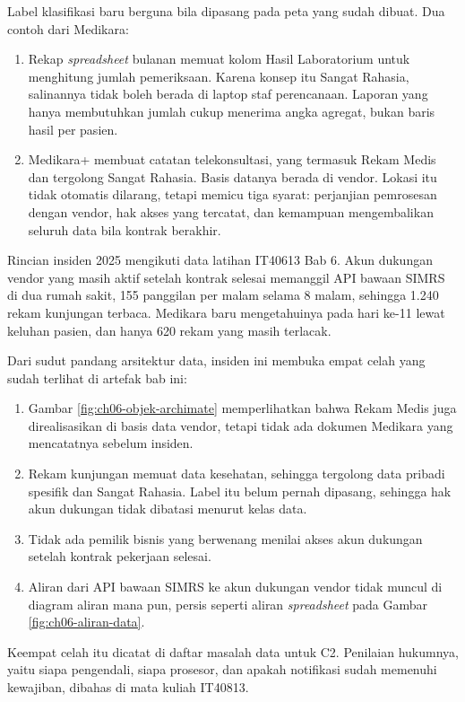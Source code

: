 Label klasifikasi baru berguna bila dipasang pada peta yang sudah dibuat. Dua
contoh dari Medikara:

\begin{enumerate}
  \item Rekap \textit{spreadsheet} bulanan memuat kolom Hasil Laboratorium untuk
        menghitung jumlah pemeriksaan. Karena konsep itu Sangat Rahasia,
        salinannya tidak boleh berada di laptop staf perencanaan. Laporan yang
        hanya membutuhkan jumlah cukup menerima angka agregat, bukan baris
        hasil per pasien.
  \item Medikara+ membuat catatan telekonsultasi, yang termasuk Rekam Medis
        dan tergolong Sangat Rahasia. Basis datanya berada di vendor. Lokasi
        itu tidak otomatis dilarang, tetapi memicu tiga syarat: perjanjian
        pemrosesan dengan vendor, hak akses yang tercatat, dan kemampuan
        mengembalikan seluruh data bila kontrak berakhir.
\end{enumerate}

\begin{kasus}[title={Kasus Medikara Health: Kebocoran Lewat Vendor dari Sudut Pandang Data}]
  Rincian insiden 2025 mengikuti data latihan IT40613 Bab 6. Akun dukungan
  vendor yang masih aktif setelah kontrak selesai memanggil API bawaan SIMRS di
  dua rumah sakit, 155 panggilan per malam selama 8 malam, sehingga 1.240 rekam
  kunjungan terbaca. Medikara baru mengetahuinya pada hari ke-11 lewat keluhan
  pasien, dan hanya 620 rekam yang masih terlacak.

  Dari sudut pandang arsitektur data, insiden ini membuka empat celah yang
  sudah terlihat di artefak bab ini:

  \begin{enumerate}
    \item Gambar \ref{fig:ch06-objek-archimate} memperlihatkan bahwa Rekam
          Medis juga direalisasikan di basis data vendor, tetapi tidak ada
          dokumen Medikara yang mencatatnya sebelum insiden.
    \item Rekam kunjungan memuat data kesehatan, sehingga tergolong data
          pribadi spesifik dan Sangat Rahasia. Label itu belum pernah dipasang,
          sehingga hak akun dukungan tidak dibatasi menurut kelas data.
    \item Tidak ada pemilik bisnis yang berwenang menilai akses akun dukungan
          setelah kontrak pekerjaan selesai.
    \item Aliran dari API bawaan SIMRS ke akun dukungan vendor tidak muncul di
          diagram aliran mana pun, persis seperti aliran \textit{spreadsheet}
          pada Gambar \ref{fig:ch06-aliran-data}.
  \end{enumerate}

  Keempat celah itu dicatat di daftar masalah data untuk C2. Penilaian hukumnya,
  yaitu siapa pengendali, siapa prosesor, dan apakah notifikasi sudah memenuhi
  kewajiban, dibahas di mata kuliah IT40813.
\end{kasus}

